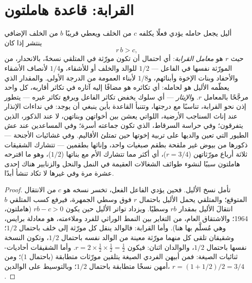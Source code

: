 \section{القرابة: قاعدة هاملتون}

\begin{theorem}\label{thm:b3:behavioural-ecology:hamilton}
أليل يجعل حامله يؤدي فعلًا يكلفه $c$ من الخلف ويعطي قريبًا
$b$ من الخلف الإضافي ينتشر إذا كان
\[
r\,b > c ,
\]
حيث $r$ هو \emph{معامل القرابة}: أي احتمال
أن تكون مورّثة في المتلقي نسخةً، بالانحدار، من المورّثة نفسها
في الفاعل --- $1/2$ للوالد والخلف أو للأشقاء،
و$1/4$ لأنصاف الأشقاء والأحفاد وبنات الإخوة وأبنائهم، و$1/8$
لأبناء العمومة من الدرجة الأولى. والمقدار الذي يعظّمه الأليل
هو \emph{} لحامله: أي تكاثره هو مضافًا إليه
آثاره في تكاثر أقاربه، كل واحد مرجَّحًا بالمعامل $r$. و\emph{الإيثار}
--- أي سلوك يخفض تكاثر الفاعل ويرفع تكاثر غيره ---
يتطور إذن نحو القرابة، تناسبًا مع درجتها، وتتنبأ
القاعدة بأين ينبغي أن يوجد: في نداءات الإنذار عند إناث
السناجب الأرضية، اللواتي يعشن بين أخواتهن وبناتهن، لا عند
الذكور، الذين يتفرقون؛ وفي حراسة السرقاط، الذي تكون جماعته
أسرة؛ وفي المساعدين عند عش الطيور التي تعين والديها على
تربية إخوتها حين تمتلئ الأقاليم. وفي غشائيات الأجنحة
\emph{} --- ذكورها من بيوض غير ملقحة بطقم
صبغيات واحد، وإناثها بطقمين --- تتشارك الشقيقات ثلاثة
أرباع مورّثاتهن ($r = 3/4$)، أي أكثر مما تتشارك الأم مع
بناتها ($1/2$)، وهو ما اقترحه هاملتون سببًا لنشوء
طوائف الشغالات العقيمة في النمل والنحل والزنابير هناك إحدى
عشرة مرة وفي غيرها لا تكاد تنشأ أبدًا.
\end{theorem}
\begin{proof}
تأمل نسخ الأليل. فحين يؤدي الفاعل الفعل، تخسر نسخه هو $c$ من
الانتقال المتوقع؛ والمتلقي يحمل الأليل باحتمال $r$ فوق وسطي
الجمهرة، فيرفع كسب المتلقي $b$ انتقالَ الأليل بمقدار $rb$
وسطيًا. ويزداد تواتر الأليل حين يكون $rb - c > 0$ (هاملتون،
1964؛ والاشتقاق العام، من التغاير بين النمط الوراثي للفرد
وملاءمته، هو معادلة برايس، وهي مُسلَّم بها
هنا). وأما القرابة: فالوالد ينقل كل مورّثة إلى خلف باحتمال
$1/2$؛ وشقيقان تلقى كل منهما مورّثة معينة من
الوالد نفسه باحتمال $1/2$، وتكون النسخة نفسها باحتمال
$1/2$، والوالدان اثنان: فيكون $r = 2\times\tfrac{1}{2}
\times\tfrac{1}{2} = \tfrac{1}{2}$. وأما الشقيقات أحاديات-ثنائيات
الصيغة: فمن أبيهن الفردي الصيغة يتلقين مورّثات متطابقة
(باحتمال $1$)؛ ومن أمهن نسخًا متطابقة باحتمال $1/2$؛ وبالتوسيط
على الوالدين، $r = (1 + 1/2)/2 = 3/4$.
\end{proof}

